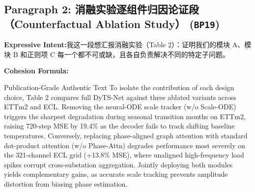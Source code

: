 \subsection*{Paragraph 2: 消融实验逐组件归因论证段（Counterfactual Ablation Study） (\texttt{BP19})}
\noindent\textbf{Expressive Intent:}\enspace 我这一段想汇报消融实验（Table 2）：证明我们的模块 A、模块 B 和正则项 C 每一个都不可或缺，且各自负责解决不同的特定子问题。\par
\noindent\textbf{Cohesion Formula:}\par\vspace{4pt}
\begin{ExampleBox}{Publication-Grade Authentic Text}
To isolate the contribution of each design choice, Table 2 compares full DyTS-Net against three ablated variants across ETTm2 and ECL. Removing the neural-ODE scale tracker (w/o Scale-ODE) triggers the sharpest degradation during seasonal transition months on ETTm2, raising 720-step MSE by 19.4\% as the decoder fails to track shifting baseline temperatures. Conversely, replacing phase-aligned graph attention with standard dot-product attention (w/o Phase-Attn) degrades performance most severely on the 321-channel ECL grid (+13.8\% MSE), where unaligned high-frequency load spikes corrupt cross-substation aggregation. Jointly deploying both modules yields complementary gains, as accurate scale tracking prevents amplitude distortion from biasing phase estimation.
\end{ExampleBox}
